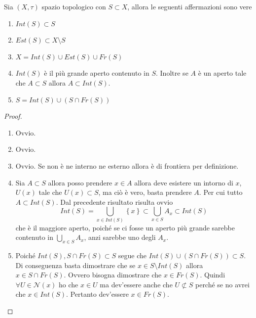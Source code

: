 \begin{proposition}
	Sia $(X,\tau)$ spazio topologico con $S \subset X$, allora le seguenti affermazioni sono vere
	\begin{enumerate}
		\item $Int(S) \subset S$
		\item $Est(S) \subset X \setminus S$
		\item $X = Int(S) \cup Est(S) \cup Fr(S)$ 
		\item $Int(S)$ è il più grande aperto contenuto in $S$. Inoltre se $A$ è un aperto tale che $A \subset S$ allora $A \subset Int(S)$.	
		\item $S = Int(S) \cup (S \cap Fr(S))$ \label{thr:set_decomposition_inner_frontier}
	\end{enumerate}
\end{proposition}
\begin{proof}
	\begin{enumerate}
		\item Ovvio.
		\item Ovvio.
		\item Ovvio. Se non è ne interno ne esterno allora è di frontiera per definizione.
		\item Sia $A \subset S$ allora posso prendere $x \in A$ allora deve esistere un intorno di $x$, $U(x)$ tale che $U(x) \subset S$, ma ciò è vero, basta prendere $A$. Per cui tutto $A \subset Int(S)$. Dal precedente risultato risulta ovvio
		\begin{equation*}
			Int(S) = \bigcup_{x\in Int(S)} \left\{x\right\} \subset \bigcup_{x \in S} A_x \subset Int(S) 
		\end{equation*}
		che è il maggiore aperto, poiché se ci fosse un aperto più grande sarebbe contenuto in $\bigcup_{x \in S} A_x$, anzi sarebbe uno degli $A_x$.
		\item Poiché $Int(S), S \cap Fr(S) \subset S$ segue che $Int(S) \cup (S \cap Fr(S)) \subset S$. Di conseguenza basta dimostrare che se $x \in S \setminus Int(S)$ allora $x \in S \cap Fr(S)$. Ovvero bisogna dimostrare che $x \in Fr(S)$. Quindi $\forall U \in \mathcal{N}(x)$ ho che $x \in U$ ma dev'essere anche che $U \not \subset S$ perché se no avrei che $x \in Int(S)$. Pertanto dev'essere $x \in Fr(S)$.
	\end{enumerate}
\end{proof}

